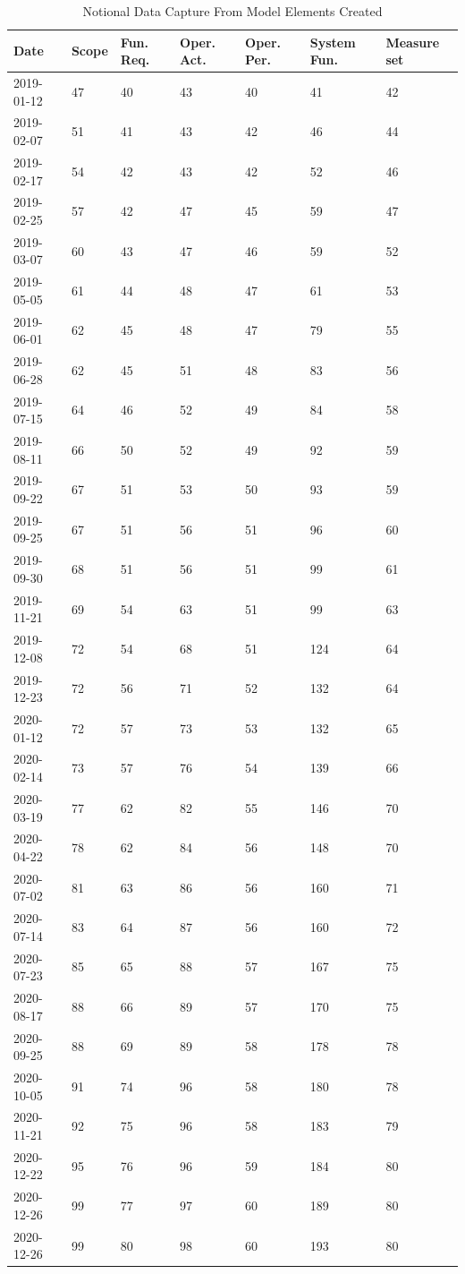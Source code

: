 \documentclass[num-refs]{wiley-article}
\begin{document}
\begin{table}
\begin{center}
\begin{tabular}{ | m{6em} | m{1cm} | m{1cm} | m{1cm} | m{1cm} | m{1cm} | m{1cm}}
Date & Scope & Fun. Req. & Oper. Act. & Oper. Per. & System Fun. & Measure set\\
\hline
2019-01-12 & 47 & 40 & 43 & 40 & 41 & 42\\
2019-02-07 & 51 & 41 & 43 & 42 & 46 & 44\\
2019-02-17 & 54 & 42 & 43 & 42 & 52 & 46\\
2019-02-25 & 57 & 42 & 47 & 45 & 59 & 47\\
2019-03-07 & 60 & 43 & 47 & 46 & 59 & 52\\
2019-05-05 & 61 & 44 & 48 & 47 & 61 & 53\\
2019-06-01 & 62 & 45 & 48 & 47 & 79 & 55\\
2019-06-28 & 62 & 45 & 51 & 48 & 83 & 56\\
2019-07-15 & 64 & 46 & 52 & 49 & 84 & 58\\
2019-08-11 & 66 & 50 & 52 & 49 & 92 & 59\\
2019-09-22 & 67 & 51 & 53 & 50 & 93 & 59\\
2019-09-25 & 67 & 51 & 56 & 51 & 96 & 60\\
2019-09-30 & 68 & 51 & 56 & 51 & 99 & 61\\
2019-11-21 & 69 & 54 & 63 & 51 & 99 & 63\\
2019-12-08 & 72 & 54 & 68 & 51 & 124 & 64\\
2019-12-23 & 72 & 56 & 71 & 52 & 132 & 64\\
2020-01-12 & 72 & 57 & 73 & 53 & 132 & 65\\
2020-02-14 & 73 & 57 & 76 & 54 & 139 & 66\\
2020-03-19 & 77 & 62 & 82 & 55 & 146 & 70\\
2020-04-22 & 78 & 62 & 84 & 56 & 148 & 70\\
2020-07-02 & 81 & 63 & 86 & 56 & 160 & 71\\
2020-07-14 & 83 & 64 & 87 & 56 & 160 & 72\\
2020-07-23 & 85 & 65 & 88 & 57 & 167 & 75\\
2020-08-17 & 88 & 66 & 89 & 57 & 170 & 75\\
2020-09-25 & 88 & 69 & 89 & 58 & 178 & 78\\
2020-10-05 & 91 & 74 & 96 & 58 & 180 & 78\\
2020-11-21 & 92 & 75 & 96 & 58 & 183 & 79\\
2020-12-22 & 95 & 76 & 96 & 59 & 184 & 80\\
2020-12-26 & 99 & 77 & 97 & 60 & 189 & 80\\
2020-12-26 & 99 & 80 & 98 & 60 & 193 & 80\\
\end{tabular}
\caption{Notional Data Capture From Model Elements Created}
\label{table2}
\end{center}
\end{table}
\end{document}
